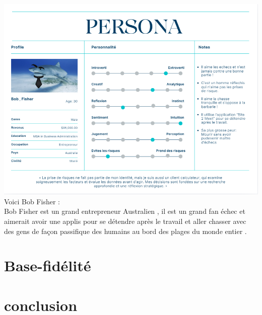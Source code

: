 \documentclass{article}
\begin{document}
\includegraphics[width=1\textwidth]{photo/Persona_Nizar.png}\\

Voici Bob Fisher :\\

Bob Fisher est un grand entrepreneur Australien , il est un grand fan échec et aimerait avoir une applis
pour se détendre après le travail et aller chasser avec des gens de façon passifique des humains au bord 
des plages du monde entier . 





\section{Base-fidélité}


\section{conclusion}
\end{document}
